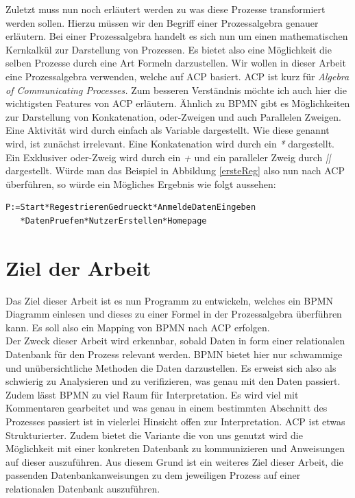 Zuletzt muss nun noch erläutert werden zu was diese Prozesse transformiert werden sollen. Hierzu müssen wir den Begriff einer Prozessalgebra genauer erläutern. Bei einer Prozessalgebra handelt es sich nun um einen mathematischen Kernkalkül zur Darstellung von Prozessen. Es bietet also eine Möglichkeit die selben Prozesse durch eine Art Formeln darzustellen. Wir wollen in dieser Arbeit eine Prozessalgebra verwenden, welche auf ACP basiert. ACP ist kurz für \textit{Algebra of Communicating Processes.} Zum besseren Verständnis möchte ich auch hier die wichtigsten Features von ACP erläutern. Ähnlich zu BPMN gibt es Möglichkeiten zur Darstellung von Konkatenation, oder-Zweigen und auch Parallelen Zweigen. Eine Aktivität wird durch einfach als Variable dargestellt. Wie diese genannt wird, ist zunächst irrelevant. Eine Konkatenation wird durch ein \textit{*} dargestellt. Ein Exklusiver oder-Zweig wird durch ein \textit{+} und ein paralleler Zweig durch \textit{||} dargestellt. Würde man das Beispiel in Abbildung  \ref{ersteReg} also nun nach ACP überführen, so würde ein Mögliches Ergebnis wie folgt aussehen:\\
\begin{verbatim}
P:=Start*RegestrierenGedrueckt*AnmeldeDatenEingeben
   *DatenPruefen*NutzerErstellen*Homepage 
\end{verbatim}
\section {Ziel der Arbeit}\label {Ziel der Arbeit}
Das Ziel dieser Arbeit ist es nun Programm zu entwickeln, welches ein BPMN Diagramm einlesen und dieses zu einer Formel in der Prozessalgebra überführen kann. Es soll also ein Mapping von BPMN nach ACP erfolgen.\\
Der Zweck dieser Arbeit wird erkennbar, sobald Daten in form einer relationalen Datenbank für den Prozess relevant werden. BPMN bietet hier nur schwammige und unübersichtliche Methoden die Daten darzustellen. Es erweist sich also als schwierig zu Analysieren und zu verifizieren, was genau mit den Daten passiert. Zudem lässt BPMN zu viel Raum für Interpretation. Es wird viel mit Kommentaren gearbeitet und was genau in einem bestimmten Abschnitt des Prozesses passiert ist in vielerlei Hinsicht offen zur Interpretation. ACP ist etwas Strukturierter. Zudem bietet die Variante die von uns genutzt wird die Möglichkeit mit einer konkreten Datenbank zu kommunizieren und Anweisungen auf dieser auszuführen. Aus diesem Grund ist ein weiteres Ziel dieser Arbeit, die passenden Datenbankanweisungen zu dem jeweiligen Prozess auf einer relationalen Datenbank auszuführen.




